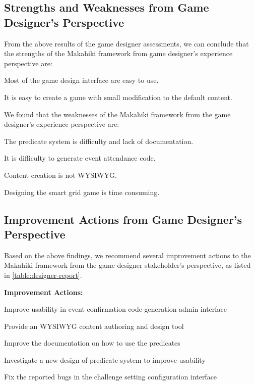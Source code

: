 \subsection{Strengths and Weaknesses from Game Designer's Perspective}
    
From the above results of the game designer assessments, we can conclude that the strengths of the Makahiki framework from game designer's experience perspective are:
    \begin{compactenum}
    \item Most of the game design interface are easy to use.
    \item It is easy to create a game with small modification to the default content.
    \end{compactenum} 

We found that the weaknesses of the Makahiki framework from the game designer's experience perspective are:
    \begin{compactenum}
    \item The predicate system is difficulty and lack of documentation. 
    \item It is difficulty to generate event attendance code.
    \item Content creation is not WYSIWYG.
    \item Designing the smart grid game is time consuming.
    \end{compactenum} 

\subsection{Improvement Actions from Game Designer's Perspective}

Based on the above findings, we recommend several improvement actions to the Makahiki framework from the game designer stakeholder's perspective, as listed in \autoref{table:designer-report}.

\begin{table}[ht!]
\begin{shadebox}
{\bf Improvement Actions:}
\begin{compactenum}
\item Improve usability in event confirmation code generation admin interface
\item Provide an WYSIWYG content authoring and design tool
\item Improve the documentation on how to use the predicates
\item Investigate a new design of predicate system to improve usability
\item Fix the reported bugs in the challenge setting configuration interface  
\end{compactenum}
\end{shadebox}
\caption{SGSEAM Improvement Action Report from Game Designer Stakeholder's Perspective}
\label{table:designer-report}
\end{table}


